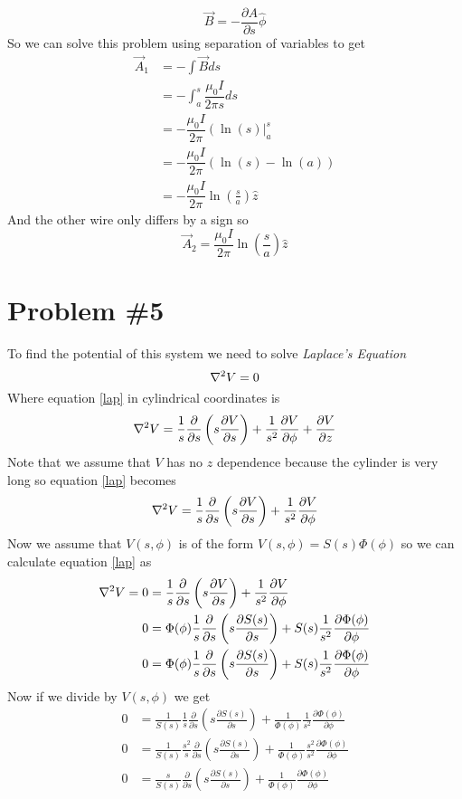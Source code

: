 \documentclass[11pt]{article}
\numberwithin{equation}{section}
\newcommand{\grad}{\bold\nabla}
\begin{document}
$$\vec{B} = -\frac{\partial A}{\partial s} \hat{\phi}$$
So we can solve this problem using separation of variables to get
\begin{align*}
\vec{A}_1 &= -\int\vec{B}ds\\
&= -\int_a^s \dfrac{\mu_0I}{2\pi s}ds\\
&= -\dfrac{\mu_0I}{2\pi}\left(\ln(s)\right|_a^s\\
&= -\dfrac{\mu_0I}{2\pi}\left(\ln(s)-\ln(a)\right)\\
&= -\dfrac{\mu_0I}{2\pi}\ln\left(\frac{s}{a}\right)\hat{z}
\end{align*}
And the other wire only differs by a sign so
$$\vec{A}_2= \dfrac{\mu_0I}{2\pi}\ln\left(\frac{s}{a}\right)\hat{z}$$

\section{Problem \#5}
To find the potential of this system we need to solve \emph{Laplace's Equation}
\begin{equation}
\grad^2V = 0
\label{lap}
\end{equation}
Where equation \ref{lap} in cylindrical coordinates is
$$\grad^2V = \frac{1}{s}\frac{\partial}{\partial s}\left(s\frac{\partial V}{\partial s}\right) + \frac{1}{s^2}\frac{\partial V}{\partial \phi} + \frac{\partial V}{\partial z}$$
Note that we assume that $V$ has no $z$ dependence because the cylinder is very long so equation \ref{lap} becomes
$$\grad^2V = \frac{1}{s}\frac{\partial}{\partial s}\left(s\frac{\partial V}{\partial s}\right) + \frac{1}{s^2}\frac{\partial V}{\partial \phi}$$
Now we assume that $V(s,\phi)$ is of the form $V(s,\phi) = S(s)\Phi(\phi)$ so we can calculate equation \ref{lap} as
\begin{align*}
\grad^2V = 0 &= \frac{1}{s}\frac{\partial}{\partial s}\left(s\frac{\partial V}{\partial s}\right) + \frac{1}{s^2}\frac{\partial V}{\partial \phi}\\
0 &= \Phi(\phi)\frac{1}{s}\frac{\partial}{\partial s}\left(s\frac{\partial S(s)}{\partial s}\right) + S(s)\frac{1}{s^2}\frac{\partial \Phi(\phi)}{\partial \phi}\\
0 &= \Phi(\phi)\frac{1}{s}\frac{\partial}{\partial s}\left(s\frac{\partial S(s)}{\partial s}\right) + S(s)\frac{1}{s^2}\frac{\partial \Phi(\phi)}{\partial \phi}
\end{align*}
Now if we divide by $V(s,\phi)$ we get
\begin{align*}
0 &= \frac{1}{S(s)}\frac{1}{s}\frac{\partial}{\partial s}\left(s\frac{\partial S(s)}{\partial s}\right) + \frac{1}{\Phi(\phi)}\frac{1}{s^2}\frac{\partial \Phi(\phi)}{\partial \phi}\\
0 &= \frac{1}{S(s)}\frac{s^2}{s}\frac{\partial}{\partial s}\left(s\frac{\partial S(s)}{\partial s}\right) + \frac{1}{\Phi(\phi)}\frac{s^2}{s^2}\frac{\partial \Phi(\phi)}{\partial \phi}\\
0 &= \frac{s}{S(s)}\frac{\partial}{\partial s}\left(s\frac{\partial S(s)}{\partial s}\right) + \frac{1}{\Phi(\phi)}\frac{\partial \Phi(\phi)}{\partial \phi}
\end{align*}
\end{document}

